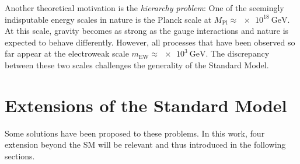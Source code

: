Another theoretical motivation is the \emph{hierarchy problem}\cite{Arkani-Hamed:Hierarchyproblemnew}: One of the seemingly indisputable energy scales in nature is the Planck scale at $M_\text{Pl} \approx \SI{e18}{\GeV}$. At this scale, gravity becomes as strong as the gauge interactions and nature is expected to behave differently. However, all processes that have been observed so far appear at the electroweak scale $m_\text{EW} \approx \SI{e3}{\GeV}$. The discrepancy between these two scales challenges the generality of the Standard Model.


\section{Extensions of the Standard Model}
Some solutions have been proposed to these problems. In this work, four extension beyond the \acl{SM} will be relevant and thus introduced in the following sections.
%
%
%
%
